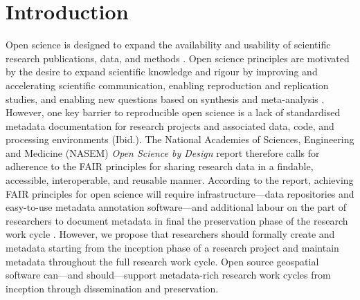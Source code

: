 \documentclass{isprs} %
\begin{document}

\maketitle


\sloppy

\section{Introduction}\label{Introduction}

Open science is designed to expand the availability and usability of scientific research publications, data, and methods \citep{NASEM2018}.
Open science principles are motivated by the desire to expand scientific knowledge and rigour by improving and accelerating scientific communication, enabling reproduction and replication studies, and enabling new questions based on synthesis and meta-analysis \citep{NASEM2018,NASEM2019}. 
However, one key barrier to reproducible open science is a lack of standardised metadata documentation for research projects and associated data, code, and processing environments (Ibid.).
The National Academies of Sciences, Engineering and Medicine (NASEM) \textit{Open Science by Design} \citeyear{NASEM2018} report therefore calls for adherence to the FAIR principles \citep{Wilkinson2016} for sharing research data in a findable, accessible, interoperable, and reusable manner.
According to the report, achieving FAIR principles for open science will require infrastructure---data repositories and easy-to-use metadata annotation software---and additional labour on the part of researchers to document metadata in final the preservation phase of the research work cycle \citep{NASEM2018}. 
However, we propose that researchers should formally create and metadata starting from the inception phase of a research project and maintain metadata throughout the full research work cycle.
Open source geospatial software can---and should---support metadata-rich research work cycles from inception through dissemination and preservation.
\end{document}
